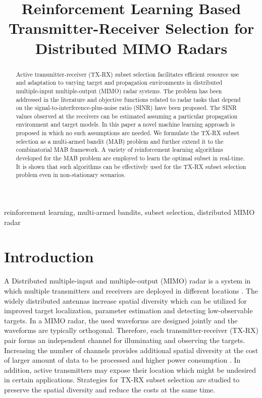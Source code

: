 \documentclass[conference]{IEEEtran}
\title{Reinforcement Learning Based Transmitter-Receiver Selection for Distributed MIMO Radars}
\author{
	\IEEEauthorblockN{
        Petteri~Pulkkinen,
	    Tuomas~Aittom\"aki, and
        Visa~Koivunen%
	}
	\IEEEauthorblockA{
		Department of Signal Processing and Acoustics, \\
		Aalto University \\
		PO Box 15400, FI-00076 Aalto, Finland \\
	}
}
\begin{document}
\maketitle

\begin{abstract}

Active transmitter-receiver (TX-RX) subset selection facilitates efficient resource use and adaptation to varying target and propagation environments in distributed multiple-input multiple-output (MIMO) radar systems.
The problem has been addressed in the literature and objective functions related to radar tasks that depend on the signal-to-interference-plus-noise ratio (SINR) have been proposed. 
The SINR values observed at the receivers can be estimated assuming a particular propagation environment and target models. 
In this paper a novel machine learning approach is proposed in which no such assumptions are needed.
We formulate the TX-RX subset selection as a multi-armed bandit (MAB) problem and further extend it to the combinatorial MAB framework.
A variety of reinforcement learning algorithms developed for the MAB problem are employed to learn the optimal subset in real-time.
It is shown that such algorithms can be effectively used for the TX-RX subset selection problem even in non-stationary scenarios.

\end{abstract}

\begin{IEEEkeywords}
reinforcement learning, multi-armed bandits, subset selection, distributed MIMO radar
\end{IEEEkeywords}


\section{Introduction}
\label{sec:intro}

A Distributed multiple-input and multiple-output (MIMO) radar is a system in which multiple transmitters and receivers are deployed in different locations \cite{distributed}.
The widely distributed antennas increase spatial diversity which can be utilized for improved target localization, parameter estimation and detecting low-observable targets.
In a MIMO radar, the used waveforms are designed jointly and the waveforms are typically orthogonal.
Therefore, each transmitter-receiver (TX-RX) pair forms an independent channel for illuminating and observing the targets.
Increasing the number of channels provides additional spatial diversity at the cost of larger amount of data to be processed and higher power consumption \cite{antenna_subset_selection, selection_and_placement, aittomaki1}.
In addition, active transmitters may expose their location which might be undesired in certain applications.
Strategies for TX-RX subset selection are studied to preserve the spatial diversity and reduce the costs at the same time.
\end{document}
